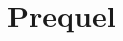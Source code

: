 \documentclass[11pt, openany]{article} %
\begin{document}
%
%
%

\newpage

\section{Prequel}
\end{document}
